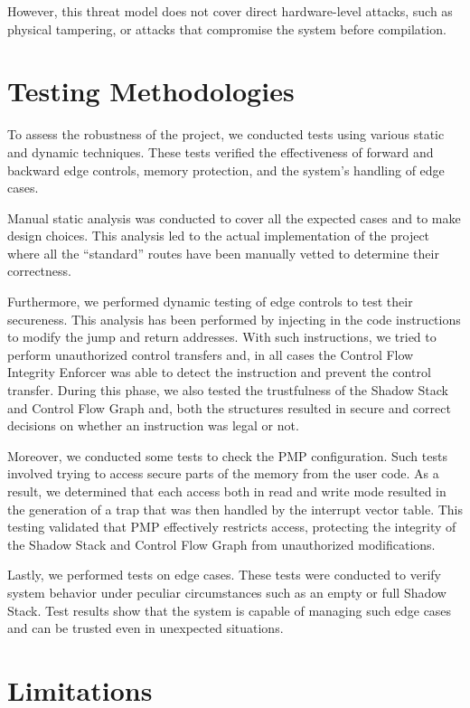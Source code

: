 However, this threat model does not cover direct hardware-level attacks, such as
physical tampering, or attacks that compromise the system before compilation.

\section{Testing Methodologies}
\label{sec:ta_methodologies}

To assess the robustness of the project, we conducted tests using various static
and dynamic techniques. These tests verified the effectiveness of forward and
backward edge controls, memory protection, and the system's handling of edge
cases.

Manual static analysis was conducted to cover all the expected cases and to make
design choices. This analysis led to the actual implementation of the project where
all the ``standard'' routes have been manually vetted to determine their correctness.

Furthermore, we performed dynamic testing of edge controls to test their
secureness. This analysis has been performed by injecting in the code instructions
to modify the jump and return addresses. With such instructions, we tried to perform
unauthorized control transfers and, in all cases the Control Flow Integrity
Enforcer was able to detect the instruction and prevent the control transfer. During
this phase, we also tested the trustfulness of the Shadow Stack and Control Flow
Graph and, both the structures resulted in secure and correct decisions on whether
an instruction was legal or not.

Moreover, we conducted some tests to check the PMP configuration. Such tests involved
trying to access secure parts of the memory from the user code. As a result, we determined
that each access both in read and write mode resulted in the generation of a trap
that was then handled by the interrupt vector table. This testing validated that
PMP effectively restricts access, protecting the integrity of the Shadow Stack and
Control Flow Graph from unauthorized modifications.

Lastly, we performed tests on edge cases. These tests were conducted to verify system
behavior under peculiar circumstances such as an empty or full Shadow Stack.
Test results show that the system is capable of managing such edge cases and can
be trusted even in unexpected situations.

\section{Limitations}
\label{sec:ta_limitations}

